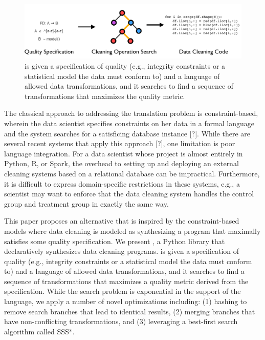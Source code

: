 \begin{figure}[t]
\centering
 \includegraphics[width=\columnwidth]{figures/intro.png}
 \caption{ \sys is given a specification of quality (e.g., integrity constraints or a statistical model the data must conform to) and a language  of  allowed  data  transformations,  and  it  searches  to find a sequence of transformations that maximizes the quality metric. }
\end{figure}

The classical approach to addressing the translation problem is constraint-based, wherein the data scientist specifies constraints on her data in a formal language and the system searches for a satisficing database instance [?].
While there are several recent systems that apply this approach [?], one limitation is poor language integration.
For a data scientist whose project is almost entirely in Python, R, or Spark, the overhead to setting up and deploying an external cleaning systems based on a relational database can be impractical.
Furthermore, it is difficult to express domain-specific restrictions in these systems, e.g., a scientist may want to enforce that the data cleaning system handles the control group and treatment group in exactly the same way.

This paper proposes an alternative that is inspired by the constraint-based models where data cleaning is modeled as synthesizing a program that maximally satisfies some quality specification.
We present \sys, a Python library that declaratively synthesizes data cleaning programs.  \sys is given a specification of quality (e.g., integrity constraints or a statistical model the data must conform to) and a language  of  allowed  data  transformations,  and  it  searches  to find a sequence of transformations that maximizes a quality metric derived from the specification.  While the search problem is exponential in the support of the language, we apply a number of novel optimizations including:  (1) hashing to remove search branches that lead to identical results, (2) merging branches that have non-conflicting  transformations,  and  (3)  leveraging  a best-first search algorithm called SSS*.


